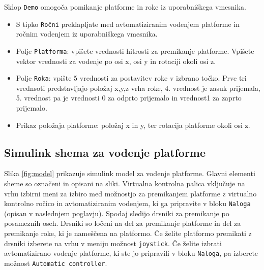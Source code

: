 Sklop \verb"Demo" omogoča pomikanje platforme in roke iz uporabniškega vmesnika. 

\begin{itemize}
	\item S tipko \verb|Ročni| preklapljate med avtomatiziranim vodenjem platforme in ročnim vodenjem iz uporabniškega vmesnika.
	\item Polje \verb|Platforma|: vpišete vrednosti hitrosti za premikanje platforme. Vpišete vektor vrednosti za vodenje po osi x, osi y in rotaciji okoli osi z.
	\item Polje \verb|Roka|: vpište 5 vrednosti za postavitev roke v izbrano točko. Prve tri vrednsoti predstavljajo položaj x,y,z vrha roke, 4. vrednost je zasuk prijemala, 5. vrednost pa je vrednosti 0 za odprto prijemalo in vrednost1 za zaprto prijemalo.
	\item Prikaz položaja platforme: položaj x in y, ter rotacija platforme okoli osi z.
\end{itemize}


\newpage

\subsection{Simulink shema za vodenje platforme}

Slika \ref{fig:model} prikazuje simulink model za vodenje platforme. Glavni elementi sheme so označeni in opisani na sliki. Virtualna
kontrolna palica vključuje na vrhu izbirni meni za izbiro med možnostjo za premikanjem platforme z virtualno kontrolno ročico in avtomatiziranim vodenjem, ki ga pripravite v bloku \verb|Naloga| (opisan v naslednjem poglavju). Spodaj sledijo drsniki za premikanje po posameznih oseh. Drsniki so ločeni na del za premikanje platforme in del za premikanje roke, ki je nameščena na platformo. Če želite platformo premikati z drsniki izberete na vrhu v meniju možnost \verb|joystick|. Če želite izbrati avtomatizirano vodenje platforme, ki ste jo pripravili v bloku \verb"Naloga", pa izberete možnost \verb|Automatic controller|.


